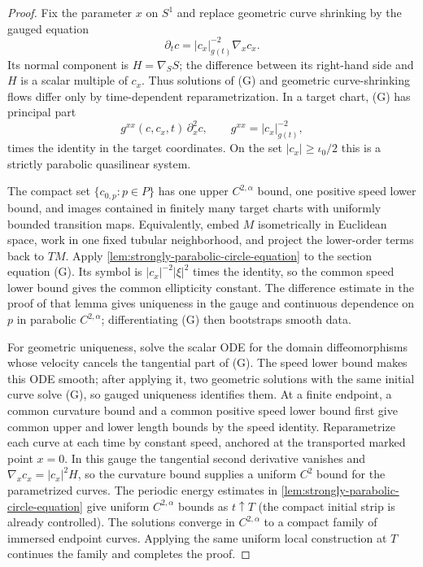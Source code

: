 \begin{proof}
Fix the parameter $x$ on $S^1$ and replace geometric curve shrinking by the
gauged equation
\[
 \partial_tc=|c_x|_{g(t)}^{-2}\nabla_xc_x.                 \tag{G}
\]
Its normal component is $H=\nabla_SS$; the difference between its right-hand
side and $H$ is a scalar multiple of $c_x$.  Thus solutions of (G) and
geometric curve-shrinking flows differ only by time-dependent
reparametrization.  In a target chart, (G) has principal part
\[
 g^{xx}(c,c_x,t)\,\partial_x^2c,
 \qquad g^{xx}=|c_x|_{g(t)}^{-2},
\]
times the identity in the target coordinates.  On the set
$|c_x|\ge\iota_0/2$ this is a strictly parabolic quasilinear system.

The compact set $\{c_{0,p}:p\in P\}$ has one upper $C^{2,\alpha}$ bound, one
positive speed lower bound, and images contained in finitely many target
charts with uniformly bounded transition maps.  Equivalently, embed $M$
isometrically in Euclidean space, work in one fixed tubular neighborhood,
and project the lower-order terms back to $TM$.  Apply
\ref{lem:strongly-parabolic-circle-equation} to the section equation (G).
Its symbol is $|c_x|^{-2}|\xi|^2$ times the identity, so the common speed
lower bound gives the common ellipticity constant.  The difference estimate
in the proof of that lemma gives uniqueness in the gauge and continuous
dependence on $p$ in parabolic $C^{2,\alpha}$; differentiating (G) then
bootstraps smooth data.

For geometric uniqueness, solve the scalar ODE for the domain
diffeomorphisms whose velocity cancels the tangential part of (G).  The speed
lower bound makes this ODE smooth; after applying it, two geometric solutions
with the same initial curve solve (G), so gauged uniqueness identifies them.
At a finite endpoint, a common curvature bound and a common positive speed
lower bound first give common upper and lower length bounds by the speed
identity.  Reparametrize each curve at each time by constant speed, anchored
at the transported marked point $x=0$.  In this gauge the tangential second
derivative vanishes and
$\nabla_xc_x=|c_x|^2H$, so the curvature bound supplies a uniform $C^2$
bound for the parametrized curves.  The periodic energy estimates in
\ref{lem:strongly-parabolic-circle-equation} give uniform $C^{2,\alpha}$
bounds as $t\uparrow T$ (the compact initial strip is already controlled).
The solutions converge in $C^{2,\alpha}$ to a compact family of immersed
endpoint curves.  Applying the same uniform local construction at $T$
continues the family and completes the proof.
\end{proof}

